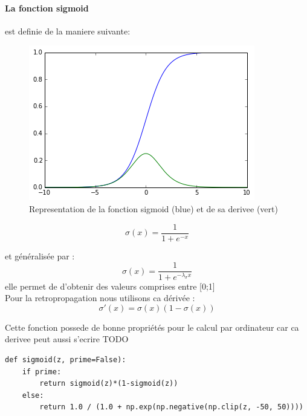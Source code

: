 \documentclass[11pt]{article}
\begin{document}
\paragraph{La fonction sigmoid} est definie de la maniere suivante: \\
\begin{figure}[htp]
	\centering
	\includegraphics[scale=.5]{img/act_sigmoid.png}
	\caption{Representation de la fonction sigmoid (blue) et de sa derivee (vert)}
\end{figure}
\begin{equation}
		\sigma(x)=\frac{1}{1+e^{-x}}
\end{equation}

et g\'en\'eralis\'ee par : \\
\begin{equation}
		\sigma(x)=\frac{1}{1+e^{-\lambda_\sigma x}}
\end{equation}
elle permet de d'obtenir des valeurs comprises entre [0;1] \\

Pour la retropropagation nous utilisons ca d\'eriv\'ee :
\begin{equation}
		\sigma'(x) = \sigma(x)(1-\sigma(x))
\end{equation}


Cette fonction possede de bonne propri\'et\'es pour le calcul par ordinateur
car ca derivee peut aussi s'ecrire TODO

\begin{lstlisting}
def sigmoid(z, prime=False):
    if prime:
		return sigmoid(z)*(1-sigmoid(z))
	else:
		return 1.0 / (1.0 + np.exp(np.negative(np.clip(z, -50, 50))))
\end{lstlisting}
\end{document}
